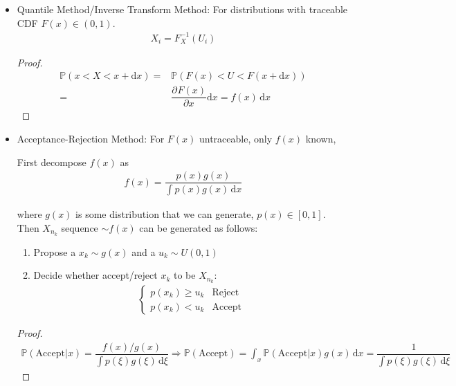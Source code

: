 \begin{itemize}[topsep=2pt,itemsep=0pt]
    \item Quantile Method/Inverse Transform Method: For distributions with traceable CDF $ F(x) \in (0,1)$.
    \begin{align}
         X_i=F^{-1}_X(U_i)
    \end{align}

    \begin{proof}
    \begin{align}
        \mathbb{P}\left(x<X<x+\mathrm{d}x \right)=&\mathbb{P}\left(F(x)<U<F(x+\mathrm{d} x)\right)\\
        =&\dfrac{\partial^{} F(x)}{\partial x^{}}\mathrm{d}x =f(x)\,\mathrm{d}x
    \end{align} 
    \end{proof}
    \item Acceptance-Rejection Method: For $ F(x) $ untraceable, only $ f(x) $ known, %
    
    First decompose $ f(x) $ as 
    \begin{align}
        f(x)=\dfrac{p(x)g(x)}{\int p(x)g(x) \,\mathrm{d}x} 
    \end{align}
    
    where $ g(x) $ is some distribution that we can generate, $ p(x)\in [0,1] $. Then $ X_{n_k} $ sequence $ \sim f(x) $ can be generated as follows:
\begin{enumerate}[topsep=2pt,itemsep=2pt]
    \item Propose a $ x_k \sim g(x)$ and a $ u_k\sim U(0,1) $
    \item Decide whether accept/reject $ x_k $ to be $ X_{n_k} $:
    \begin{align}
        \begin{cases}
            p(x_k)\geq u_k&\text{Reject}\\
            p(x_k)<u_k&\text{Accept}
        \end{cases} 
    \end{align}
\end{enumerate}
    \begin{proof}
    \begin{align}
        \mathbb{P}(\mathrm{Accept}|x )=\dfrac{f(x)\big/ g(x)}{\int p(\xi )g(\xi ) \,\mathrm{d}\xi }\Rightarrow \mathbb{P}(\mathrm{Accept} )=\int _x \mathbb{P}(\mathrm{Accept}|x )g(x)\,\mathrm{d}x=\dfrac{1}{\int p(\xi )g(\xi ) \,\mathrm{d}\xi}
    \end{align}


\end{proof}
\end{itemize}
